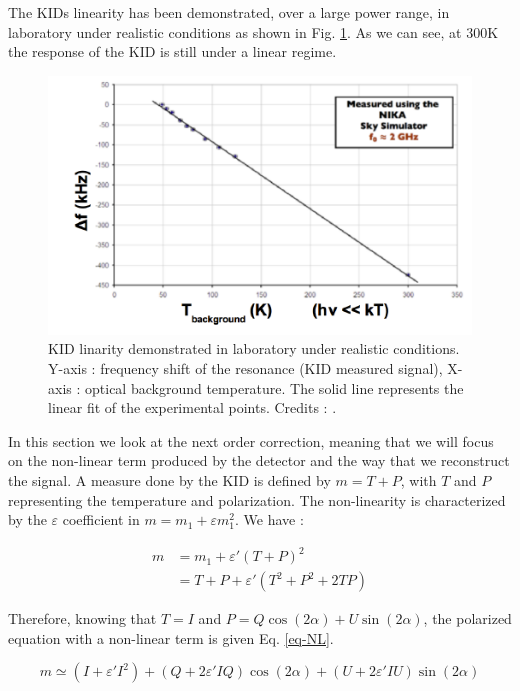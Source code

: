 The KIDs linearity has been demonstrated, over a large power range, in laboratory under realistic conditions as shown in Fig. \ref{KID-lin}. As we can see, at 300K the response of the KID is still under a linear regime.

\begin{figure}[h]
\center
	\includegraphics[scale=0.4]{KID-linearity-Monfardini2014.png}
	\caption{KID linarity demonstrated in laboratory under realistic conditions. Y-axis : frequency shift of the resonance (KID measured signal), X-axis : optical background temperature. The solid line represents the linear fit of the experimental points. Credits : \citet{2014JLTP..176..787M}.}
	\label{KID-lin}
\end{figure}

In this section we look at the next order correction, meaning that we will focus on the non-linear term produced by the detector and the way that we reconstruct the signal. A measure done by the KID is defined by $m = T + P$, with $T$ and $P$ representing the temperature and polarization. The non-linearity is characterized  by the $\varepsilon$ coefficient in $ m = m_{1} + \varepsilon m_{1}^{2}$. We have : 

\begin{equation}
\begin{split}
m & = m_{1} +\varepsilon' (T+P)^{2} \\
 & = T + P + \varepsilon'(T^{2} + P^{2} + 2TP) 
\end{split}
\end{equation}

Therefore, knowing that $T=I$ and $P = Q\cos(2\alpha) + U \sin(2\alpha)$, the polarized equation with a non-linear term is given Eq. \ref{eq-NL}.

\begin{equation}
m  \simeq (I + \varepsilon' I^{2}) + (Q + 2\varepsilon' IQ) \cos(2\alpha) + (U + 2 \varepsilon' IU) \sin(2\alpha)
\label{eq-NL}
\end{equation}

